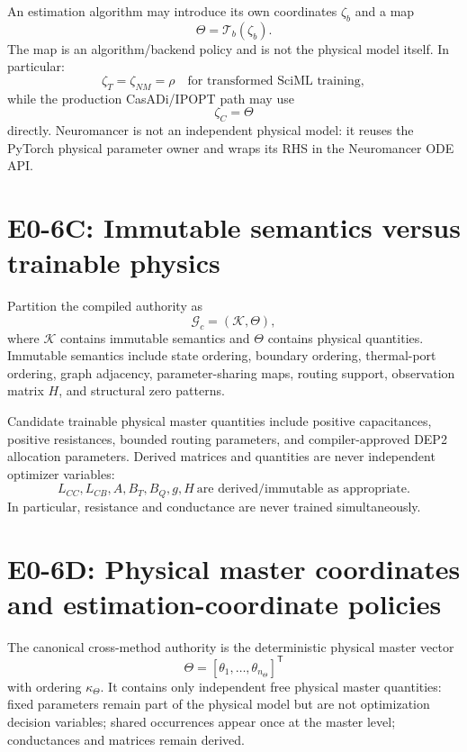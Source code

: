 \documentclass[11pt]{article}
\begin{document}
An estimation algorithm may introduce its own coordinates $\zeta_b$ and a map
\[
\Theta=\mathcal T_b(\zeta_b).
\]
The map is an algorithm/backend policy and is not the physical model itself.
In particular:
\[
\boxed{
\zeta_T=\zeta_{NM}=\rho\quad\text{for transformed SciML training},
}
\]
while the production CasADi/IPOPT path may use
\[
\boxed{\zeta_C=\Theta}
\]
directly. Neuromancer is not an independent physical model: it reuses the
PyTorch physical parameter owner and wraps its RHS in the Neuromancer ODE API.

\section{E0-6C: Immutable semantics versus trainable physics}

Partition the compiled authority as
\[
\boxed{\mathcal G_c=(\mathcal K,\Theta)},
\]
where $\mathcal K$ contains immutable semantics and $\Theta$ contains physical
quantities. Immutable semantics include state ordering, boundary ordering,
thermal-port ordering, graph adjacency, parameter-sharing maps, routing support,
observation matrix $H$, and structural zero patterns.

Candidate trainable physical master quantities include positive capacitances,
positive resistances, bounded routing parameters, and compiler-approved DEP2
allocation parameters. Derived matrices and quantities are never independent
optimizer variables:
\[
\boxed{L_{CC},L_{CB},A,B_T,B_Q,g,H\ \text{are derived/immutable as appropriate}.}
\]
In particular, resistance and conductance are never trained simultaneously.

\section{E0-6D: Physical master coordinates and estimation-coordinate policies}

The canonical cross-method authority is the deterministic physical master vector
\[
\boxed{\Theta=[\theta_1,\ldots,\theta_{n_\Theta}]^{\mathsf T}}
\]
with ordering $\kappa_\Theta$. It contains only independent free physical master
quantities: fixed parameters remain part of the physical model but are not
optimization decision variables; shared occurrences appear once at the master
level; conductances and matrices remain derived.
\end{document}
